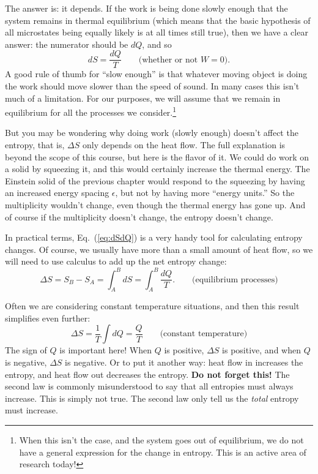 The answer is: it depends.  If the work is being done slowly enough
that the system remains in thermal equilibrium (which means that the
basic hypothesis of all microstates being equally likely is at all
times still true), then we have a clear answer: the numerator should
be $dQ$, and so
\begin{equation}
dS = \frac{dQ}{T}  \qquad\text{(whether or not $W=0$)}.
\label{eq:dSdQ}
\end{equation}
A good rule of thumb for ``slow enough'' is that whatever moving
object is doing the work should move slower than the speed of sound.
In many cases this isn't much of a limitation.  For our purposes, we
will assume that we remain in equilibrium for all the processes we
consider.\footnote{When this isn't the case, and the system goes out
  of equilibrium, we do not have a general expression for the change
  in entropy.  This is an active area of research today!}

But you may be wondering why doing work (slowly enough) doesn't affect
the entropy, that is, $\Delta S$ only depends on the heat flow.  The
full explanation is beyond the scope of this course, but here is the
flavor of it.  We could do work on a solid by squeezing it, and this
would certainly increase the thermal energy.  The Einstein solid of
the previous chapter would respond to the squeezing by having an
increased energy spacing $\epsilon$, but not by having more ``energy
units.''  So the multiplicity wouldn't change, even though the thermal
energy has gone up.  And of course if the multiplicity doesn't change,
the entropy doesn't change.

In practical terms, Eq.~(\ref{eq:dSdQ}) is a very handy tool for
calculating entropy changes.  Of course, we usually have more than a
small amount of heat flow, so we will need to use calculus to add up
the net entropy change:
\begin{equation}
\Delta S = S_B - S_A = \int_A^B dS = \int_A^B \frac{dQ}{T}.
\qquad\text{(equilibrium processes)}
\label{eq:DeltaSgeneral}
\end{equation}

Often we are considering constant temperature situations, and then
this result simplifies even further:
\begin{equation}
\Delta S= \frac{1}{T}\int dQ = \frac{Q}{T} \qquad\text{(constant temperature)}
\label{eq:deltaS_isothermal}
\end{equation}
The sign of $Q$ is important here!  When $Q$ is positive, $\Delta S$
is positive, and when $Q$ is negative, $\Delta S$ is negative.  Or to
put it another way: heat flow in increases the entropy, and heat flow
out decreases the entropy.  {\bf Do not forget this!}  The second law
is commonly misunderstood to say that all entropies must always
increase.  This is simply not true.  The second law only tell us the
{\it total} entropy must increase.

